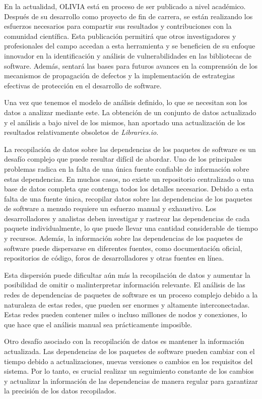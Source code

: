 En la actualidad, OLIVIA está en proceso de ser publicado a nivel académico.
Después de su desarrollo como proyecto de fin de carrera, se están realizando los esfuerzos necesarios para 
compartir sus resultados y contribuciones con la comunidad científica.
Esta publicación permitirá que otros investigadores y profesionales del campo accedan a esta herramienta y se 
beneficien de su enfoque innovador en la identificación y análisis de vulnerabilidades en las bibliotecas de software. 
Además, sentará las bases para futuros avances
en la comprensión de los mecanismos de propagación de defectos y la implementación de estrategias efectivas de 
protección en el desarrollo de software.

Una vez que tenemos el modelo de análisis definido, lo que se necesitan son los datos a analizar mediante este.
La obtención de un conjunto de datos actualizado y el análisis a bajo nivel de los mismos, han aportado una 
actualización de los resultados relativamente obsoletos de \textit{Libraries.io}.

La recopilación de datos sobre las dependencias de los paquetes de software es un desafío complejo que puede 
resultar difícil de abordar.
Uno de los principales problemas radica en la falta de una única fuente confiable de información sobre estas dependencias.
En muchos casos, no existe un repositorio centralizado o una base de datos completa que contenga todos los detalles necesarios.
Debido a esta falta de una fuente única, recopilar datos sobre las dependencias de los paquetes de software a menudo 
requiere un esfuerzo manual y exhaustivo.
Los desarrolladores y analistas deben investigar y rastrear las dependencias de cada paquete individualmente, lo 
que puede llevar una cantidad considerable de tiempo y recursos.
Además, la información sobre las dependencias de los paquetes de software puede dispersarse en diferentes fuentes, 
como documentación oficial, repositorios de código, foros de desarrolladores y otras fuentes en línea.


Esta dispersión puede dificultar aún más la recopilación de datos y aumentar la posibilidad de omitir o malinterpretar 
información relevante.
El análisis de las redes de dependencias de paquetes de software es un proceso complejo debido a la naturaleza de estas 
redes, que pueden ser enormes y altamente interconectadas. Estas redes pueden contener miles o incluso millones de 
nodos y conexiones, lo que hace que el análisis manual sea prácticamente imposible.


Otro desafío asociado con la recopilación de datos es mantener la información actualizada. Las dependencias de los 
paquetes de software pueden cambiar con el tiempo debido a actualizaciones, nuevas versiones o cambios en los requisitos 
del sistema. Por lo tanto, es crucial realizar un seguimiento constante de los cambios y actualizar la información 
de las dependencias de manera regular para garantizar la precisión de los datos recopilados.


